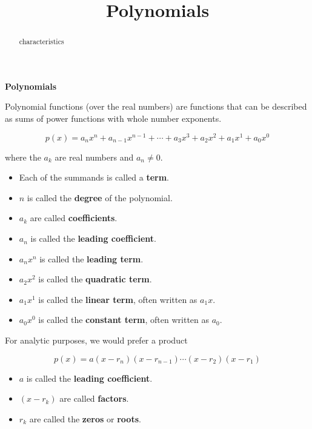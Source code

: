 \documentclass{ximera}
\title{Polynomials}
\begin{document}
\begin{abstract}
characteristics
\end{abstract}
\maketitle




\begin{definition} \textbf{\textcolor{green!50!black}{Polynomials}} 


Polynomial functions (over the real numbers) are functions that can be described as sums of power functions with whole number exponents.


\[    p(x) = a_n x^n + a_{n-1} x^{n-1} + \cdots + a_3 x^3 + a_2 x^2 + a_1 x^1 + a_0 x^0      \]

where the $a_k$ are real numbers and $a_n \ne 0$.


\begin{itemize}
\item Each of the summands is called a \textbf{term}.  
\item $n$ is called the \textbf{degree} of the polynomial.
\item $a_k$ are called \textbf{coefficients}.
\item $a_n$ is called the \textbf{leading coefficient}.
\item $a_n x^n$ is called the \textbf{leading term}.
\item $a_2 x^2$ is called the \textbf{quadratic term}.
\item $a_1 x^1$ is called the \textbf{linear term}, often written as $a_1 x$.
\item $a_0 x^0$ is called the \textbf{constant term}, often written as $a_0$.

\end{itemize}

\end{definition}





For analytic purposes, we would prefer a product

\[   p(x) = a (x-r_n)(x-r_{n-1})  \cdots (x-r_2)(x-r_1)  \]


\begin{itemize}

\item $a$ is called the \textbf{leading coefficient}.
\item $(x-r_k)$ are called \textbf{factors}.
\item $r_k$ are called the \textbf{zeros} or \textbf{roots}.

\end{itemize}
\end{document}
